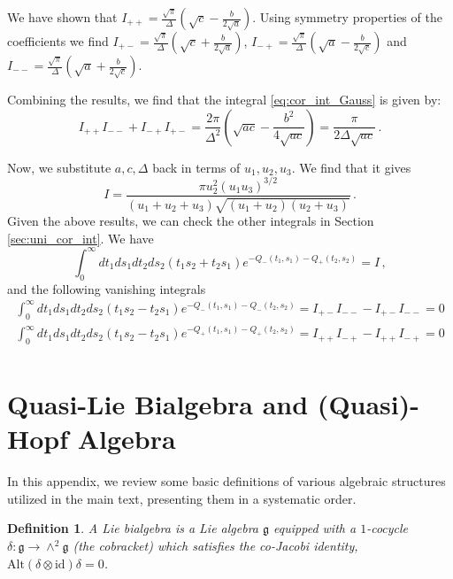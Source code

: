\documentclass[11pt]{article}
\numberwithin{equation}{section}
\newtheorem{definition}{Definition}[section]
\begin{document}
We have shown that $I_{++} = \frac{\sqrt{\pi}}{\Delta} \left( \sqrt{c} - \frac{b}{2\sqrt{a}} \right)$. Using symmetry properties of the coefficients we find $I_{+-} = \frac{\sqrt{\pi}}{\Delta} \left( \sqrt{c} + \frac{b}{2\sqrt{a}} \right)$,  $I_{-+} = \frac{\sqrt{\pi}}{\Delta} \left( \sqrt{a} - \frac{b}{2\sqrt{c}} \right)$ and $I_{--} = \frac{\sqrt{\pi}}{\Delta} \left( \sqrt{a} + \frac{b}{2\sqrt{c}} \right)$.

Combining the results, we find that the integral \eqref{eq:cor_int_Gauss} is given by:
\begin{equation}
	I_{++} I_{--} + I_{-+} I_{+-} = \frac{2\pi}{\Delta^2} \left( \sqrt{ac} - \frac{b^2}{4\sqrt{ac}} \right) = \frac{\pi}{2 \Delta \sqrt{ac}}\,.
\end{equation}

Now, we substitute $a, c, \Delta$ back in terms of $u_1, u_2, u_3$. We find that it gives 
\begin{equation}
	I = \frac{\pi  u_2^2  (u_1 u_3)^{3/2}}{(u_1+u_2+u_3) \sqrt{(u_1+u_2)(u_2+u_3)}}\,.
\end{equation}
Given the above results, we can check the other integrals in Section \ref{sec:uni_cor_int}. We have 
\begin{equation}
	\int_{0}^{\infty} dt_1 ds_1 dt_2 ds_2 (t_1 s_2 + t_2 s_1) e^{-Q_-(t_1, s_1) -Q_+(t_2, s_2)} = I \,,
\end{equation}
and the following vanishing integrals
\begin{equation}
	\begin{aligned}
			\int_{0}^{\infty} dt_1 ds_1 dt_2 ds_2 (t_1 s_2 - t_2 s_1) e^{-Q_-(t_1, s_1) -Q_-(t_2, s_2)} = I_{+-}I_{--}-I_{+-}I_{--} = 0 \\
			\int_{0}^{\infty} dt_1 ds_1 dt_2 ds_2 (t_1 s_2 - t_2 s_1) e^{-Q_+(t_1, s_1) -Q_+(t_2, s_2)} = I_{++}I_{-+}-I_{++}I_{-+} = 0 \\
	\end{aligned}
\end{equation}

\section{Quasi-Lie Bialgebra and (Quasi)-Hopf Algebra}
\label{sec:bialgebra}
In this appendix, we review some basic definitions of various algebraic structures utilized in the main text, presenting them in a systematic order.

\begin{definition}
A \emph{Lie bialgebra} is a Lie algebra $\mathfrak{g}$ equipped with a $1$-cocycle $\delta: \mathfrak{g} \to \wedge^2\mathfrak{g}$ (the cobracket) which satisfies the co-Jacobi identity, $\mathrm{Alt}(\delta \otimes \mathrm{id})\delta = 0$.
\end{definition}
\end{document}

